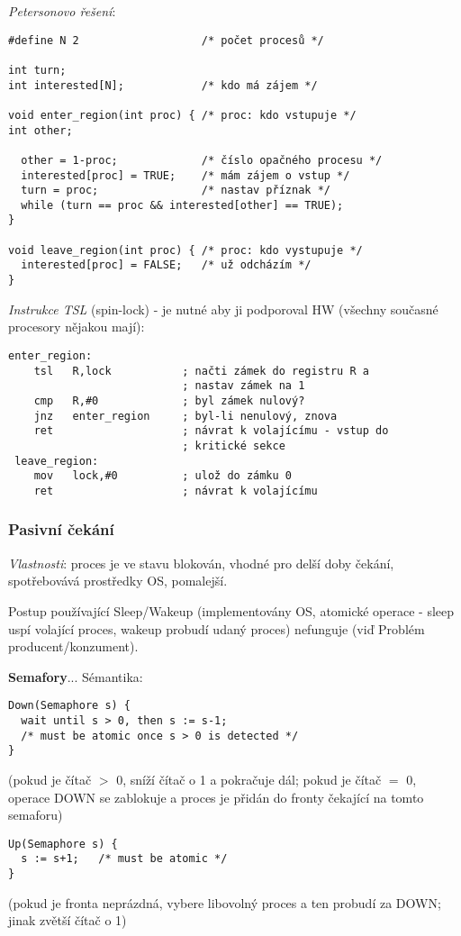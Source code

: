 \emph{Petersonovo řešení}:
\begin{verbatim}
#define N 2                   /* počet procesů */
 
int turn;
int interested[N];            /* kdo má zájem */
 
void enter_region(int proc) { /* proc: kdo vstupuje */
int other;
 
  other = 1-proc;             /* číslo opačného procesu */
  interested[proc] = TRUE;    /* mám zájem o vstup */
  turn = proc;                /* nastav příznak */
  while (turn == proc && interested[other] == TRUE);
}
 
void leave_region(int proc) { /* proc: kdo vystupuje */
  interested[proc] = FALSE;   /* už odcházím */
}
\end{verbatim}
 
\emph{Instrukce TSL} (spin-lock) - je nutné aby ji podporoval HW (všechny současné procesory nějakou mají):
\begin{verbatim}
enter_region:
    tsl   R,lock           ; načti zámek do registru R a
                           ; nastav zámek na 1
    cmp   R,#0             ; byl zámek nulový?
    jnz   enter_region     ; byl-li nenulový, znova
    ret                    ; návrat k volajícímu - vstup do
                           ; kritické sekce
 leave_region:
    mov   lock,#0          ; ulož do zámku 0
    ret                    ; návrat k volajícímu
\end{verbatim}

\subsubsection*{Pasivní čekání}
\emph{Vlastnosti}: proces je ve stavu blokován, vhodné pro delší doby čekání, spotřebovává prostředky OS, pomalejší.

Postup používající Sleep/Wakeup (implementovány OS, atomické operace - sleep uspí volající proces, wakeup probudí udaný proces) nefunguje (viď Problém producent/konzument).

\textbf{Semafory}... Sémantika:
\begin{verbatim}
Down(Semaphore s) {
  wait until s > 0, then s := s-1;
  /* must be atomic once s > 0 is detected */
}
\end{verbatim}
(pokud je čítač $>$ 0, sníží čítač o 1 a pokračuje dál; pokud je čítač $=$ 0, operace DOWN se zablokuje a proces je přidán do fronty čekající na tomto semaforu)

\begin{verbatim}
Up(Semaphore s) {
  s := s+1;   /* must be atomic */
}
\end{verbatim}
(pokud je fronta neprázdná, vybere libovolný proces a ten probudí za DOWN; jinak zvětší čítač o 1)


